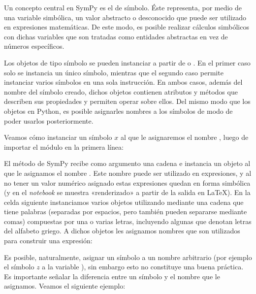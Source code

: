 Un concepto central en SymPy es el de símbolo. Éste representa, por medio de una variable simbólica, un valor abstracto o desconocido que puede ser utilizado en expresiones matemáticas. De este modo, es posible realizar cálculos simbólicos con dichas variables que son tratadas como entidades abstractas en vez de números específicos. 

Los objetos de tipo símbolo se pueden instanciar a partir de  o . En el primer caso solo se instancia un único símbolo, mientras que el segundo caso permite instanciar varios símbolos en una sola instrucción. En ambos casos, además del nombre del símbolo creado, dichos objetos contienen atributos y métodos que describen sus propiedades y permiten operar sobre ellos. Del mismo modo que los objetos en Python, es posible asignarles nombres a los símbolos de modo de poder usarlos posteriormente.

Veamos cómo instanciar un símbolo $x$ al que le asignaremos el nombre , luego de importar el módulo  en la primera línea:

 
El método  de SymPy recibe como argumento una cadena e instancia un objeto  al que le asignamos el nombre . Este nombre puede ser utilizado en expresiones, y al no tener un valor numérico asignado estas expresiones quedan en forma simbólica (y en el \textit{notebook} se muestra «renderizado» a partir de la salida en \LaTeX{}). En la celda siguiente instanciamos varios objetos utilizando  mediante una cadena que tiene palabras (separadas por espacios, pero también pueden separarse mediante comas) compuestas por una o varias letras, incluyendo algunas que denotan letras del alfabeto griego. A dichos objetos les asignamos nombres que son utilizados para construir una expresión:


Es posible, naturalmente, asignar un símbolo a un nombre arbitrario (por ejemplo el símbolo $z$ a la variable ), sin embargo esto no constituye una buena práctica. Es importante señalar la diferencia entre un símbolo y el nombre que le asignamos. Veamos el siguiente ejemplo:


